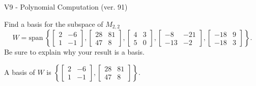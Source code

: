 \begin{exercise}
  \begin{exerciseTitle}V9 - Polynomial Computation (ver. 91)\end{exerciseTitle}
  \begin{exerciseStatement}
    Find a basis for the subspace of \(M_{2,2}\) 
\[W=\mathrm{span}\ \left\{\left[\begin{array}{cc}
2 & -6 \\
1 & -1
\end{array}\right] , \left[\begin{array}{cc}
28 & 81 \\
47 & 8
\end{array}\right] , \left[\begin{array}{cc}
4 & 3 \\
5 & 0
\end{array}\right] , \left[\begin{array}{cc}
-8 & -21 \\
-13 & -2
\end{array}\right] , \left[\begin{array}{cc}
-18 & 9 \\
-18 & 3
\end{array}\right]\right\}.\]
 Be sure to explain why your result is a basis.


  \end{exerciseStatement}
  \begin{exerciseAnswer}
   A basis of \(W\) is  \(\left\{\left[\begin{array}{cc}
2 & -6 \\
1 & -1
\end{array}\right] , \left[\begin{array}{cc}
28 & 81 \\
47 & 8
\end{array}\right]\right\}\).
  


  \end{exerciseAnswer}
\end{exercise}